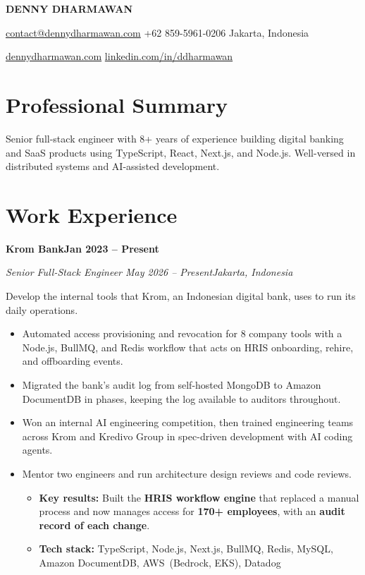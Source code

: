 \documentclass[11pt,letterpaper]{article}
\newcommand{\company}[2]{%
  \Needspace{8\baselineskip}
  \vspace{8pt}
  {\headfont\bfseries\color{heading}#1\hfill#2\par}
}
\newcommand{\role}[4]{%
  \Needspace{6\baselineskip}
  \vspace{2pt}
  {\itshape\color{muted}#1\if\relax\detokenize{#2}\relax\else{} \textbar{} #2\fi\hfill #3\par}
  \vspace{1pt}
  #4\par
}
\newcommand{\keyResults}[1]{\item \textbf{Key results:} #1}
\newcommand{\techStack}[1]{\item \textbf{Tech stack:} #1}
\begin{document}
\begin{center}
  {\headfont\fontsize{22}{26}\selectfont\bfseries\color{heading} DENNY DHARMAWAN\par}
  \vspace{4pt}
  {\normalsize\color{heading}%
    \newcommand{\sep}{\enspace\textbar\enspace}%
    \href{mailto:contact@dennydharmawan.com}{contact@dennydharmawan.com}\sep
    +62 859-5961-0206\sep
    Jakarta, Indonesia\par
    \vspace{2pt}
    \href{https://dennydharmawan.com}{dennydharmawan.com}\sep
    \href{https://linkedin.com/in/ddharmawan}{linkedin.com/in/ddharmawan}\par
  }
\end{center}
\vspace{1pt}

\section{Professional Summary}
Senior full-stack engineer with 8+ years of experience building digital banking and SaaS products using TypeScript, React, Next.js, and Node.js. Well-versed in distributed systems and AI-assisted development.

\section{Work Experience}

\company{Krom Bank}{Jan 2023 -- Present}
\role{Senior Full-Stack Engineer}{May 2026 -- Present}{Jakarta, Indonesia}{Develop the internal tools that Krom, an Indonesian digital bank, uses to run its daily operations.}
\begin{itemize}
  \item Automated access provisioning and revocation for 8 company tools with a Node.js, BullMQ, and Redis workflow that acts on HRIS onboarding, rehire, and offboarding events.
  \item Migrated the bank's audit log from self-hosted MongoDB to Amazon DocumentDB in phases, keeping the log available to auditors throughout.
  \item Won an internal AI engineering competition, then trained engineering teams across Krom and Kredivo Group in spec-driven development with AI coding agents.
  \item Mentor two engineers and run architecture design reviews and code reviews.
  \begin{itemize}
    \keyResults{Built the \textbf{HRIS workflow engine} that replaced a manual process and now manages access for \textbf{170+ employees}, with an \textbf{audit record of each change}.}
    \techStack{TypeScript, Node.js, Next.js, BullMQ, Redis, MySQL, Amazon DocumentDB, AWS~(Bedrock, EKS), Datadog}
  \end{itemize}
\end{itemize}
\end{document}
